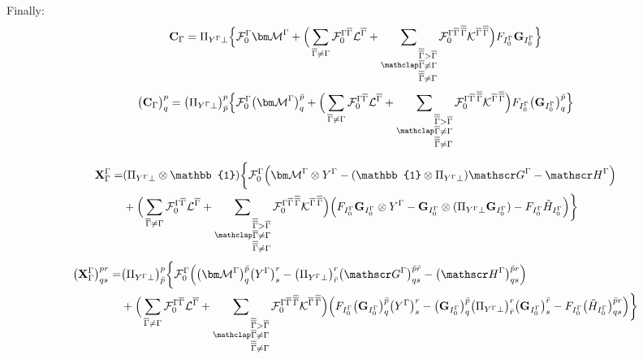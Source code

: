 \documentclass[a4paper,11pt]{article}
\begin{document}
Finally:
\begin{equation}
  \mathbf{C}_\irp =
  \Pi_{Y^\irp \perp} \Big\{
  \mathcal{F}_0^\irp \matM^\irp
  + \Big(
      \sumB \mathcal{F}_0^{\irp\irpB} \mathcal{L}^\irpB
      + \sumBB \mathcal{F}_0^{\irp\irpB\,\irpBB} \mathcal{K}^{\irpB\,\irpBB}
  \Big) F_{I_0^\irp} \matG_{I_0^\irp}
  \Big\}
\end{equation}
\begin{equation}
  \big( \mathbf{C}_\irp \big)^p_q =
  \big( \Pi_{Y^\irp \perp} \big)^p_{\bar{p}} \Big\{
  \mathcal{F}_0^\irp \big( \matM^\irp \big)^{\bar{p}}_q
  + \Big(
      \sumB \mathcal{F}_0^{\irp\irpB} \mathcal{L}^\irpB
      + \sumBB \mathcal{F}_0^{\irp\irpB\,\irpBB} \mathcal{K}^{\irpB\,\irpBB}
  \Big) F_{I_0^\irp} \big( \matG_{I_0^\irp} \big)^{\bar{p}}_q
  \Big\}
\end{equation}

\begin{equation}
  \begin{split}
    \mathbf{X}_\irp^\irp = &
    (\Pi_{Y^\irp \perp} \otimes \mathbb{1})
    \bigg\{ \mathcal{F}_0^\irp
    \Big(
        \matM^\irp \otimes Y^\irp
        - (\mathbb{1} \otimes \Pi_{Y^\irp \perp}) \bigG^\irp
        - \bigH^\irp
    \Big)\\
    & +
    \Big(
        \sumB \mathcal{F}_0^{\irp\irpB} \mathcal{L}^\irpB
        + \sumBB \mathcal{F}_0^{\irp\irpB\,\irpBB} \mathcal{K}^{\irpB\,\irpBB}
    \Big)
    \Big(
        F_{I_0^\irp} \matG_{I_0^\irp} \otimes Y^\irp
        - \matG_{I_0^\irp} \otimes (\Pi_{Y^\irp \perp} \matG_{I_0^\irp})
        - F_{I_0^\irp} \tilde{H}_{I_0^\irp}
    \Big)
    \bigg\}
  \end{split}
\end{equation}
\begin{equation}
  \begin{split}
    \big( \mathbf{X}_\irp^\irp \big)^{pr}_{qs} = &
    \big( \Pi_{Y^\irp \perp} \big)^p_{\bar{p}} \bigg\{ \mathcal{F}_0^\irp
    \Big(
        \big( \matM^\irp \big)^{\bar{p}}_q \big( Y^\irp \big)^r_s
        - \big( \Pi_{Y^\irp \perp} \big)^r_{\bar{r}} \big( \bigG^\irp \big)^{\bar{p}\bar{r}}_{qs}
        - \big( \bigH^\irp \big)^{\bar{p}r}_{qs}
    \Big)\\
    & +
    \Big(
        \sumB \mathcal{F}_0^{\irp\irpB} \mathcal{L}^\irpB
        + \sumBB \mathcal{F}_0^{\irp\irpB\,\irpBB} \mathcal{K}^{\irpB\,\irpBB}
    \Big)
    \Big(
        F_{I_0^\irp} \big( \matG_{I_0^\irp} \big)^{\bar{p}}_q \big( Y^\irp \big)^r_s
        - \big( \matG_{I_0^\irp} \big)^{\bar{p}}_q
          \big( \Pi_{Y^\irp \perp} \big)^r_{\bar{r}}
          \big( \matG_{I_0^\irp} \big)^{\bar{r}}_s
        - F_{I_0^\irp} \big( \tilde{H}_{I_0^\irp} \big)^{\bar{p}r}_{qs}
    \Big)
    \bigg\}
  \end{split}
\end{equation}
\end{document}
